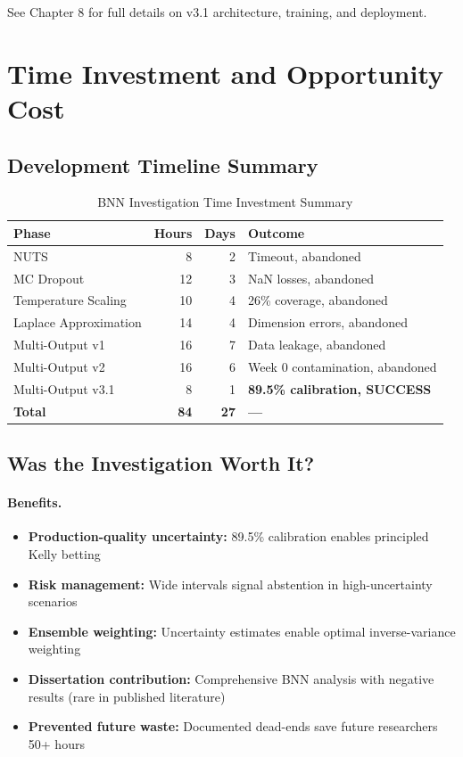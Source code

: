 See Chapter 8 for full details on v3.1 architecture, training, and deployment.

\section{Time Investment and Opportunity Cost}

\subsection{Development Timeline Summary}

\begin{table}[!ht]
\centering
\caption{BNN Investigation Time Investment Summary}
\label{tab:time-investment}
\begin{tabular}{@{} l r r l @{}}
\toprule
\textbf{Phase}  & \textbf{Hours}  & \textbf{Days}  & \textbf{Outcome} \\
\midrule
NUTS & 8 & 2 & Timeout, abandoned \\
MC Dropout & 12 & 3 & NaN losses, abandoned \\
Temperature Scaling & 10 & 4 & 26\% coverage, abandoned \\
Laplace Approximation & 14 & 4 & Dimension errors, abandoned \\
Multi-Output v1 & 16 & 7 & Data leakage, abandoned \\
Multi-Output v2 & 16 & 6 & Week 0 contamination, abandoned \\
Multi-Output v3.1 & 8 & 1 & \textbf{89.5\% calibration, SUCCESS} \\
\midrule
\textbf{Total} & \textbf{84} & \textbf{27} & \textbf{---} \\
\bottomrule
\end{tabular}
\end{table}

\subsection{Was the Investigation Worth It?}

\paragraph{Benefits.}
\begin{itemize}
  \item \textbf{Production-quality uncertainty:} 89.5\% calibration enables principled Kelly betting
  \item \textbf{Risk management:} Wide intervals signal abstention in high-uncertainty scenarios
  \item \textbf{Ensemble weighting:} Uncertainty estimates enable optimal inverse-variance weighting
  \item \textbf{Dissertation contribution:} Comprehensive BNN analysis with negative results (rare in published literature)
  \item \textbf{Prevented future waste:} Documented dead-ends save future researchers 50+ hours
\end{itemize}

